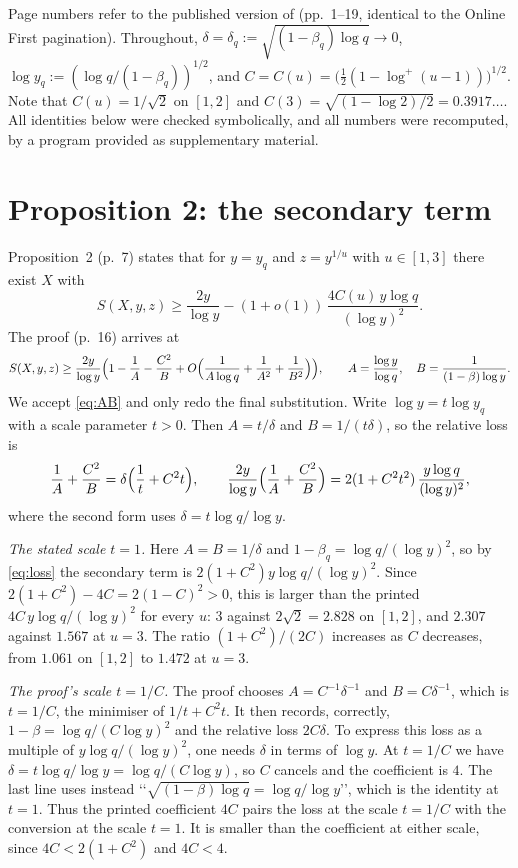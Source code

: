 \documentclass[11pt,a4paper]{amsart}
\theoremstyle{remark}
\begin{document}
Page numbers refer to the published version of \cite{G} (pp.~1--19, identical to the Online First pagination). Throughout,
$\delta=\delta_q:=\sqrt{(1-\beta_q)\log q}\to0$, $\log y_q:=(\log q/(1-\beta_q))^{1/2}$, and
$C=C(u)=\bigl(\tfrac12(1-\log^+(u-1))\bigr)^{1/2}$. Note that $C(u)=1/\sqrt2$ on $[1,2]$ and
$C(3)=\sqrt{(1-\log2)/2}=0.3917\ldots$. All identities below were checked symbolically, and all numbers
were recomputed, by a program provided as supplementary material.

\section{Proposition 2: the secondary term}\label{sec:prop2}

Proposition~2 (p.~7) states that for $y=y_q$ and $z=y^{1/u}$ with $u\in[1,3]$ there exist $X$ with
\begin{equation}\label{eq:P2}
S(X,y,z)\ge\frac{2y}{\log y}-(1+o(1))\,\frac{4C(u)\,y\log q}{(\log y)^2}.
\end{equation}
The proof (p.~16) arrives at
\begin{equation}\label{eq:AB}
S(X,y,z)\ge\frac{2y}{\log y}\Bigl(1-\frac1A-\frac{C^2}{B}+O\Bigl(\frac1{A\log q}+\frac1{A^2}+\frac1{B^2}\Bigr)\Bigr),
\qquad A=\frac{\log y}{\log q},\quad B=\frac1{(1-\beta)\log y}.
\end{equation}
We accept \eqref{eq:AB} and only redo the final substitution. Write $\log y=t\log y_q$ with a scale
parameter $t>0$. Then $A=t/\delta$ and $B=1/(t\delta)$, so the relative loss is
\begin{equation}\label{eq:loss}
\frac1A+\frac{C^2}{B}=\delta\Bigl(\frac1t+C^2t\Bigr),\qquad
\frac{2y}{\log y}\Bigl(\frac1A+\frac{C^2}B\Bigr)=2(1+C^2t^2)\,\frac{y\log q}{(\log y)^2},
\end{equation}
where the second form uses $\delta=t\log q/\log y$.

\emph{The stated scale $t=1$.} Here $A=B=1/\delta$ and $1-\beta_q=\log q/(\log y)^2$, so by
\eqref{eq:loss} the secondary term is $2(1+C^2)y\log q/(\log y)^2$. Since $2(1+C^2)-4C=2(1-C)^2>0$, this is
larger than the printed $4C\,y\log q/(\log y)^2$ for every $u$: $3$ against $2\sqrt2=2.828$ on $[1,2]$,
and $2.307$ against $1.567$ at $u=3$. The ratio $(1+C^2)/(2C)$ increases as $C$ decreases, from $1.061$
on $[1,2]$ to $1.472$ at $u=3$.

\emph{The proof's scale $t=1/C$.} The proof chooses $A=C^{-1}\delta^{-1}$ and $B=C\delta^{-1}$, which is
$t=1/C$, the minimiser of $1/t+C^2t$. It then records, correctly, $1-\beta=\log q/(C\log y)^2$ and the
relative loss $2C\delta$. To express this loss as a multiple of $y\log q/(\log y)^2$, one needs $\delta$
in terms of $\log y$. At $t=1/C$ we have $\delta=t\log q/\log y=\log q/(C\log y)$, so $C$ cancels and the
coefficient is $4$. The last line uses instead \lq\lq$\sqrt{(1-\beta)\log q}=\log q/\log y$\rq\rq, which is
the identity at $t=1$. Thus the printed coefficient $4C$ pairs the loss at the scale $t=1/C$ with the
conversion at the scale $t=1$. It is smaller than the coefficient at either scale, since $4C<2(1+C^2)$
and $4C<4$.
\end{document}
